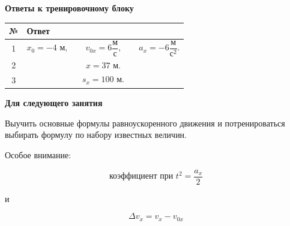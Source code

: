 \documentclass[a4paper,12pt]{article}
\begin{document}
\begin{center}
{\LARGE\bfseries\color{darkaccent}
Ответы к тренировочному блоку}
\end{center}

\vspace{9mm}

\begin{table}[ht]
\centering
\begin{tabularx}{\linewidth}{@{}c X@{}}
\toprule
\textbf{№} & \textbf{Ответ} \\
\midrule

1 &
\[
x_0=-4\text{ м},
\qquad
v_{0x}=6\frac{\text{м}}{\text{с}},
\qquad
a_x=-6\frac{\text{м}}{\text{с}^2}.
\]
\\[5mm]

2 &
\[
x=37\text{ м}.
\]
\\[5mm]

3 &
\[
s_x=100\text{ м}.
\]
\\

\bottomrule
\end{tabularx}
\end{table}

\vfill

\begin{center}
\large\color{darkaccent}
\textbf{Для следующего занятия}

\vspace{4mm}

Выучить основные формулы равноускоренного движения
и потренироваться выбирать формулу по набору известных величин.

\vspace{4mm}

Особое внимание:

\[
\boxed{
\text{коэффициент при }t^2=\frac{a_x}{2}
}
\]

и

\[
\boxed{
\Delta v_x=v_x-v_{0x}
}
\]

\end{center}
\end{document}
